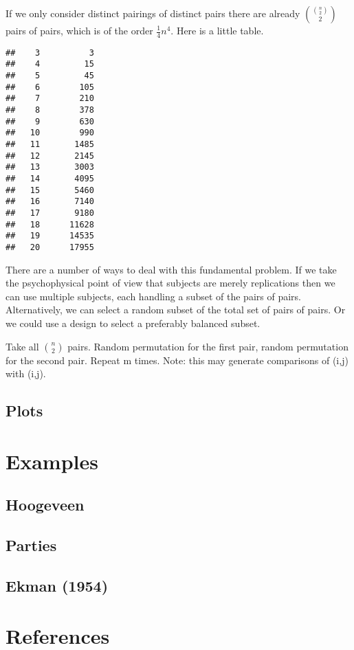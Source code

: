 \documentclass[
  12pt,
]{article}
\begin{document}
If we only consider distinct pairings of distinct pairs there are already
\(\binom{\binom{n}{2}}{2}\)
pairs of pairs, which is of the order \(\frac14n^4\). Here is a little table.

\begin{verbatim}
##    3          3 
##    4         15 
##    5         45 
##    6        105 
##    7        210 
##    8        378 
##    9        630 
##   10        990 
##   11       1485 
##   12       2145 
##   13       3003 
##   14       4095 
##   15       5460 
##   16       7140 
##   17       9180 
##   18      11628 
##   19      14535 
##   20      17955
\end{verbatim}

There are a number of ways to deal with this fundamental problem. If we take the psychophysical point of view that subjects are merely replications then we
can use multiple subjects, each handling a subset of the pairs of pairs.
Alternatively, we can select a random subset of the total set of pairs of pairs.
Or we could use a design to select a preferably balanced subset.

Take all \(\binom{n}{2}\) pairs. Random permutation for the first pair,
random permutation for the second pair. Repeat m times. Note: this may
generate comparisons of (i,j) with (i,j).

\subsection{Plots}\label{plots}

\section{Examples}\label{examples}

\subsection{Hoogeveen}\label{hoogeveen}

\subsection{Parties}\label{parties}

\subsection{Ekman (1954)}\label{ekman_54}

\section*{References}\label{references}
\end{document}
